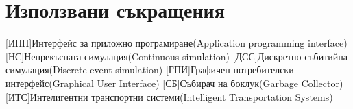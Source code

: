\appendix
\chapter{Използвани съкращения}
	\begin{acronym}[JDK]
		[ИПП]{Интерфейс за приложно програмиране(Application programming interface)}
		[НС]{Непрекъсната симулация(Continuous simulation)}
		[ДСС]{Дискретно-събитийна симулация(Discrete-event simulation)}
		[ГПИ]{Графичен потребителски интерфейс(Graphical User Interface)}
		[СБ]{Събирач на боклук(Garbage Collector)}
		[ИТС]{Интелигентни транспортни системи(Intelligent Transportation Systems)}
	\end{acronym}